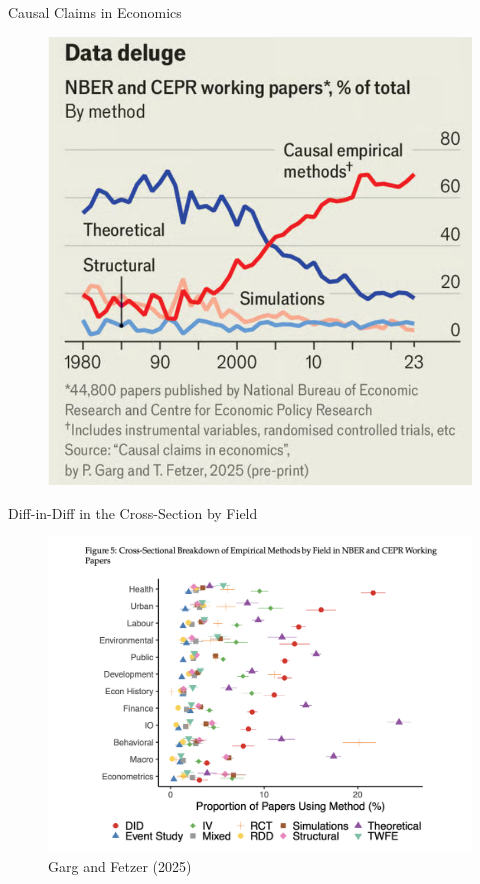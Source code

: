 \documentclass{beamer}
\begin{document}
\begin{frame}{Causal Claims in Economics}

	\begin{figure}
	\includegraphics[scale=0.4]{./lecture_includes/causal_claims}
	\end{figure}

\end{frame}


\begin{frame}{Diff-in-Diff in the Cross-Section by Field}

	\begin{figure}
	\caption{Garg and Fetzer (2025)}
	\includegraphics[scale=0.25]{./lecture_includes/did_growth2}
	\end{figure}

\end{frame}
\end{document}
